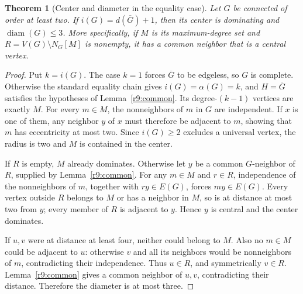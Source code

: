 \documentclass[11pt,a4paper]{article}
\newtheorem{theorem}{Theorem}[section]
\theoremstyle{remark}
\begin{document}
\begin{theorem}[Center and diameter in the equality case]
\label{r9:equalitygeometry}
Let $G$ be connected of order at least two. If
$i(G)=d(\overline G)+1$, then its center is dominating and
$\operatorname{diam}(G)\le3$.
More specifically, if $M$ is its maximum-degree set and
$R=V(G)\setminus N_G[M]$ is nonempty, it has a common neighbor
that is a central vertex.
\end{theorem}
\begin{proof}
Put $k=i(G)$. The case $k=1$ forces $\overline G$ to be edgeless,
so $G$ is complete. Otherwise the standard equality chain gives
$i(G)=\alpha(G)=k$, and $H=\overline G$ satisfies the hypotheses
of Lemma~\ref{r9:common}. Its degree-$(k-1)$ vertices are exactly $M$.
For every $m\in M$, the nonneighbors of $m$ in $G$ are independent.
If $x$ is one of them, any neighbor $y$ of $x$ must therefore be
adjacent to $m$, showing that $m$ has eccentricity at most two.
Since $i(G)\ge2$ excludes a universal vertex, the radius is two
and $M$ is contained in the center.

If $R$ is empty, $M$ already dominates. Otherwise let $y$ be a common
$G$-neighbor of $R$, supplied by Lemma~\ref{r9:common}.
For any $m\in M$ and $r\in R$, independence of the nonneighbors
of $m$, together with $ry\in E(G)$, forces $my\in E(G)$.
Every vertex outside $R$ belongs to $M$ or has a neighbor in $M$,
so is at distance at most two from $y$; every member of $R$ is
adjacent to $y$. Hence $y$ is central and the center dominates.

If $u,v$ were at distance at least four, neither could belong to $M$.
Also no $m\in M$ could be adjacent to $u$: otherwise $v$ and all
its neighbors would be nonneighbors of $m$, contradicting their
independence. Thus $u\in R$, and symmetrically $v\in R$.
Lemma~\ref{r9:common} gives a common neighbor of $u,v$, contradicting
their distance. Therefore the diameter is at most three.
\end{proof}
\end{document}
